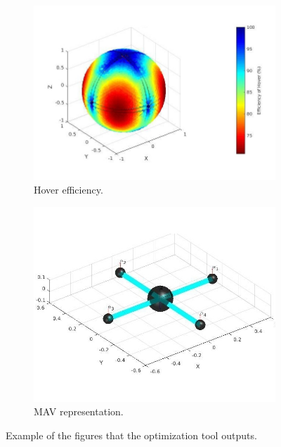 \begin{figure}[!h]
\begin{subfigure}[b]{0.48\textwidth}
    \includegraphics[width=\linewidth]{images/n=4_hover.jpg}
    \caption{Hover efficiency.} \label{fig:tool_outputc}
  \end{subfigure}
  \hspace*{\fill} %
  \begin{subfigure}[b]{0.48\textwidth}
    \includegraphics[width=\linewidth]{images/n=4_model.jpg}
    \caption{MAV representation.} \label{fig:tool_outputd}
  \end{subfigure}
  \caption{Example of the figures that the optimization tool outputs.}
  \label{fig:tool_output}
\end{figure}

